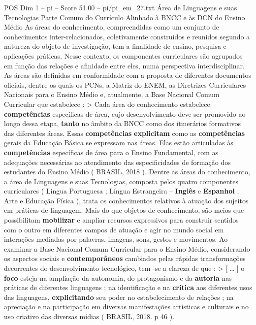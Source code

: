 \begin{textsample}{POS Dim 1 – pi – Score 51.00 – pi/pi\_em\_27.txt}  \label{ex:f1_pos_060}
Área de Linguagens e suas Tecnologias Parte Comum do Currículo Alinhado à BNCC e às DCN do Ensino Médio As áreas do conhecimento, compreendidas como um conjunto de conhecimentos inter-relacionados, coletivamente construídos e reunidos segundo a natureza do objeto de investigação, tem a finalidade de ensino, pesquisa e aplicações práticas.
Nesse contexto, os componentes curriculares são agrupados em função das relações e afinidade entre eles, numa perspectiva interdisciplinar.
As áreas são definidas em conformidade com a proposta de diferentes documentos oficiais, dentre os quais os PCNs, a Matriz do ENEM, as Diretrizes Curriculares Nacionais para o Ensino Médio e, atualmente, a Base Nacional Comum Curricular que estabelece : > Cada área do conhecimento estabelece \textbf{competências} específicas de área, cujo desenvolvimento deve ser promovido ao longo dessa etapa, \textbf{tanto} no âmbito da BNCC como dos itinerários formativos das diferentes áreas.
Essas \textbf{competências} \textbf{explicitam} como as \textbf{competências} gerais da Educação Básica se expressam nas áreas.
Elas estão articuladas às \textbf{competências} específicas de área para o Ensino Fundamental, com as adequações necessárias ao atendimento das especificidades de formação dos estudantes do Ensino Médio ( BRASIL, 2018 ).
Dentre as áreas do conhecimento, a área de Linguagens e suas Tecnologias, composta pelos quatro componentes curriculares ( Língua Portuguesa ; Língua Estrangeira – \textbf{Inglês} e \textbf{Espanhol} ; Arte e Educação Física ), trata os conhecimentos relativos à atuação dos sujeitos em práticas de linguagem.
Mais do que objetos de conhecimento, são meios que possibilitam \textbf{mobilizar} e ampliar recursos expressivos para construir sentidos com o outro em diferentes campos de atuação e agir no mundo social em interações mediadas por palavras, imagens, sons, gestos e movimentos.
Ao examinar a Base Nacional Comum Curricular para o Ensino Médio, considerando os aspectos sociais e \textbf{contemporâneos} cambiados pelas rápidas transformações decorrentes do desenvolvimento tecnológico, tem -se a clareza de que : > [ … ] o \textbf{foco} esteja na ampliação da autonomia, do protagonismo e da \textbf{autoria} nas práticas de diferentes linguagens ; na identificação e na \textbf{crítica} aos diferentes usos das linguagens, \textbf{explicitando} seu poder no estabelecimento de relações ; na apreciação e na participação em diversas manifestações artísticas e culturais e no uso criativo das diversas mídias ( BRASIL, 2018. p 46 ).

\end{textsample}
